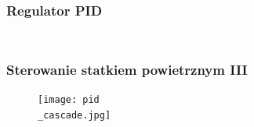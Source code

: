 \documentclass[aspectratio=169]{beamer}
\begin{document}
\begin{frame}%
	\frametitle{Regulator PID}
	\begin{columns}
		\begin{column}{0.5\textwidth}
	   	 	\begin{figure}
	   		 \centering
	    		\end{figure}
		\end{column}
		\begin{column}{0.5\textwidth}
	   	 	\begin{figure}
	   		 \centering
	    		\end{figure}
		\end{column}
	\end{columns}
	
	
\end{frame}

\begin{frame}
	\frametitle{Sterowanie statkiem powietrznym III}
	\begin{figure}
	   		 \centering
	      		 \texttt{[image: pid\\\_cascade.jpg]}
	\end{figure}
\end{frame}
\end{document}
